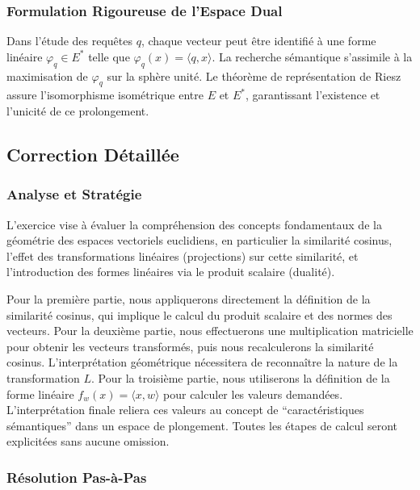 \documentclass[11pt,a4paper]{report}
\begin{document}
\hypertarget{formulation-rigoureuse-de-lespace-dual}{%
\subsubsection{Formulation Rigoureuse de l'Espace
Dual}\label{formulation-rigoureuse-de-lespace-dual}}

Dans l'étude des requêtes \(q\), chaque vecteur peut être identifié à
une forme linéaire \(\varphi_q \in E^*\) telle que
\(\varphi_q(x) = \langle q, x \rangle\). La recherche sémantique
s'assimile à la maximisation de \(\varphi_q\) sur la sphère unité. Le
théorème de représentation de Riesz assure l'isomorphisme isométrique
entre \(E\) et \(E^*\), garantissant l'existence et l'unicité de ce
prolongement.

\hypertarget{correction-duxe9tailluxe9e}{%
\subsection{Correction Détaillée}\label{correction-duxe9tailluxe9e}}

\hypertarget{analyse-et-stratuxe9gie}{%
\subsubsection{Analyse et Stratégie}\label{analyse-et-stratuxe9gie}}

L'exercice vise à évaluer la compréhension des concepts fondamentaux de
la géométrie des espaces vectoriels euclidiens, en particulier la
similarité cosinus, l'effet des transformations linéaires (projections)
sur cette similarité, et l'introduction des formes linéaires via le
produit scalaire (dualité).

Pour la première partie, nous appliquerons directement la définition de
la similarité cosinus, qui implique le calcul du produit scalaire et des
normes des vecteurs. Pour la deuxième partie, nous effectuerons une
multiplication matricielle pour obtenir les vecteurs transformés, puis
nous recalculerons la similarité cosinus. L'interprétation géométrique
nécessitera de reconnaître la nature de la transformation \(L\). Pour la
troisième partie, nous utiliserons la définition de la forme linéaire
\(f_w(x) = \langle x, w \rangle\) pour calculer les valeurs demandées.
L'interprétation finale reliera ces valeurs au concept de
``caractéristiques sémantiques'' dans un espace de plongement. Toutes
les étapes de calcul seront explicitées sans aucune omission.

\hypertarget{ruxe9solution-pas-uxe0-pas}{%
\subsubsection{Résolution Pas-à-Pas}\label{ruxe9solution-pas-uxe0-pas}}
\end{document}

